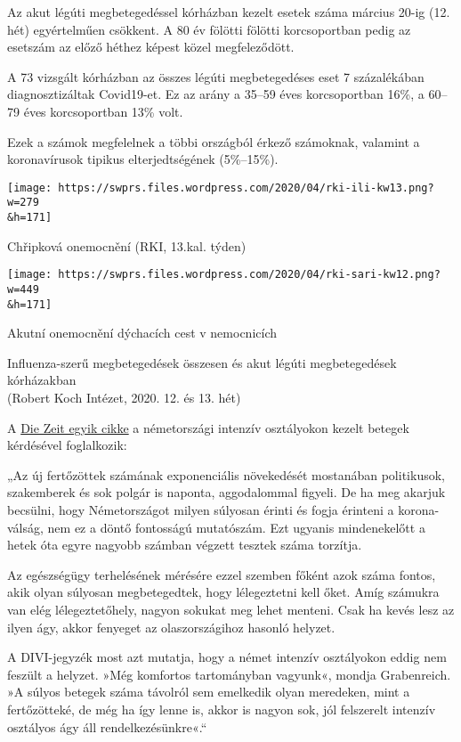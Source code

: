 Az akut légúti megbetegedéssel kórházban kezelt esetek száma március
20-ig (12. hét) egyértelműen csökkent. A 80 év fölötti fölötti
korcsoportban pedig az esetszám az előző héthez képest közel
megfeleződött.

A 73 vizsgált kórházban az összes légúti megbetegedéses eset 7
százalékában diagnosztizáltak Covid19-et. Ez az arány a 35--59 éves
korcsoportban 16\%, a 60--79 éves korcsoportban 13\% volt.

Ezek a számok megfelelnek a többi országból érkező számoknak, valamint a
koronavírusok tipikus elterjedtségének (5\%--15\%).

\href{https://swprs.files.wordpress.com/2020/04/rki-ili-kw13.png}{}

\texttt{[image: https://swprs.files.wordpress.com/2020/04/rki-ili-kw13.png?w=279\\\&h=171]}

Chřipková onemocnění (RKI, 13.kal. týden)

\href{https://swprs.files.wordpress.com/2020/04/rki-sari-kw12.png}{}

\texttt{[image: https://swprs.files.wordpress.com/2020/04/rki-sari-kw12.png?w=449\\\&h=171]}

Akutní onemocnění dýchacích cest v nemocnicích

Influenza-szerű megbetegedések összesen és akut légúti megbetegedések
kórházakban\\
(Robert Koch Intézet, 2020. 12. és 13. hét)

A
\href{https://www.zeit.de/wissen/2020-04/krankenhaeuser-kapazitaeten-coronavirus-patienten-deutschland/seite-2}{Die
Zeit egyik cikke} a németországi intenzív osztályokon kezelt betegek
kérdésével foglalkozik:

„Az új fertőzöttek számának exponenciális növekedését mostanában
politikusok, szakemberek és sok polgár is naponta, aggodalommal figyeli.
De ha meg akarjuk becsülni, hogy Németországot milyen súlyosan érinti és
fogja érinteni a korona-válság, nem ez a döntő fontosságú mutatószám.
Ezt ugyanis mindenekelőtt a hetek óta egyre nagyobb számban végzett
tesztek száma torzítja.

Az egészségügy terhelésének mérésére ezzel szemben főként azok száma
fontos, akik olyan súlyosan megbetegedtek, hogy lélegeztetni kell őket.
Amíg számukra van elég lélegeztetőhely, nagyon sokukat meg lehet
menteni. Csak ha kevés lesz az ilyen ágy, akkor fenyeget az
olaszországihoz hasonló helyzet.

A DIVI-jegyzék most azt mutatja, hogy a német intenzív osztályokon eddig
nem feszült a helyzet. »Még komfortos tartományban vagyunk«, mondja
Grabenreich. »A súlyos betegek száma távolról sem emelkedik olyan
meredeken, mint a fertőzötteké, de még ha így lenne is, akkor is nagyon
sok, jól felszerelt intenzív osztályos ágy áll rendelkezésünkre«.``

